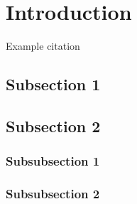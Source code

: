 \documentclass[12pt]{article} %
\begin{document}

\tableofcontents %

\newpage %


\section{Introduction} %

Example citation %


\subsection{Subsection 1} %

\lipsum[1] %


\subsection{Subsection 2} %

\lipsum[2] %


\subsubsection{Subsubsection 1} %

\lipsum[3] %


\subsubsection{Subsubsection 2} %

\lipsum[4] %
\end{document}
